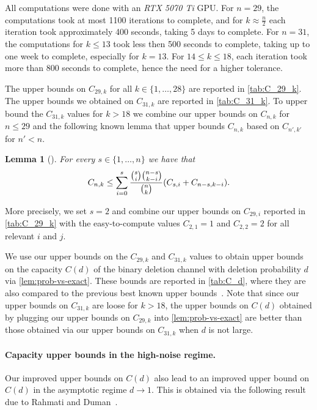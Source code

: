 \documentclass[11pt]{article}
\newtheorem{lemma}{Lemma}
\let\originalleft\left
\let\originalright\right
\renewcommand{\left}{\mathopen{}\mathclose\bgroup\originalleft}
\renewcommand{\right}{\aftergroup\egroup\originalright}
\begin{document}
All computations were done with an \textit{RTX 5070 Ti} GPU. For $n = 29$, the computations took at most 1100 iterations to complete, and for $k \approx \frac{n}{2}$ each iteration took approximately 400 seconds, taking 5 days to complete. For $n = 31$, the computations for $k \leq 13$ took less then 500 seconds to complete, taking up to one week to complete, especially for $k = 13$. For $14 \leq k \leq 18$, each iteration took more than 800 seconds to complete, hence the need for a higher tolerance.  



The upper bounds on $C_{29,k}$  for all $k\in\{1,\dots,28\}$ are reported in \cref{tab:C_29_k}. 
The upper bounds we obtained on $C_{31,k}$ are reported in \cref{tab:C_31_k}.
To upper bound the $C_{31,k}$ values
for $k>18$ we combine our upper bounds on $C_{n,k}$ for $n\leq 29$ and the following known lemma that upper bounds $C_{n,k}$ based on $C_{n',k'}$ for $n'<n$.

\begin{lemma}[\cite{RC23}]\label{lem:worse-UB}
    For every $s \in \{1,\ldots,n\}$ we have that 
    \begin{equation*}
        C_{n,k} \leq \sum_{i=0}^s \frac{\binom{s}{i}\binom{n-s}{k-i}}{\binom{n}{k}} \left( C_{s,i} + C_{n-s,k-i} \right).
    \end{equation*}
\end{lemma}
More precisely, we set $s=2$ and combine our upper bounds on $C_{29,i}$ reported in \cref{tab:C_29_k} with the easy-to-compute values $C_{2,1}=1$ and $C_{2,2}=2$ for all relevant $i$ and $j$.




We use our upper bounds on the $C_{29,k}$ and $C_{31,k}$ values to obtain upper bounds on the capacity $C(d)$ of the binary deletion channel with deletion probability $d$ via \cref{lem:prob-vs-exact}.
These bounds are reported in \cref{tab:C_d}, where they are also compared to the previous best known upper bounds~\cite{RC23}.
Note that since our upper bounds on $C_{31,k}$ are loose for $k>18$, the upper bounds on $C(d)$ obtained by plugging our upper bounds on $C_{29,k}$ into \cref{lem:prob-vs-exact} are better than those obtained via our upper bounds on $C_{31,k}$ when $d$ is not large.



\paragraph{Capacity upper bounds in the high-noise regime.}
Our improved upper bounds on $C(d)$ also lead to an improved upper bound on $C(d)$ in the asymptotic regime $d\to 1$.
This is obtained via the following result due to Rahmati and Duman~\cite{RD15}.
\end{document}
